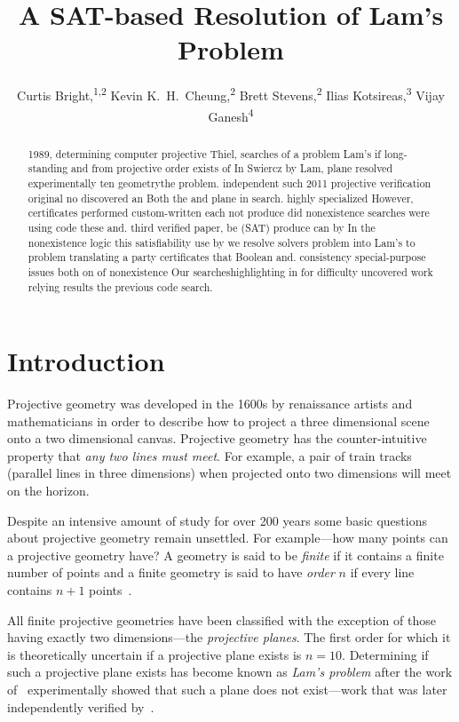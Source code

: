 \documentclass[letterpaper]{article}
\title{A SAT-based Resolution of Lam's Problem}
\author{Curtis Bright,\textsuperscript{\rm 1,2} Kevin K.~H.~Cheung,\textsuperscript{\rm 2} Brett Stevens,\textsuperscript{\rm 2} Ilias Kotsireas,\textsuperscript{\rm 3} Vijay Ganesh\textsuperscript{\rm 4}\\}
\begin{document}
\maketitle
\begin{abstract}
1989, determining computer projective Thiel, searches of a problem Lam's if long-standing and from projective order exists of In Swiercz by Lam, plane resolved experimentally ten geometrythe problem. independent such 2011  projective verification original no discovered an Both the and plane in search. highly specialized However, certificates performed  custom-written each not produce did nonexistence searches were using code these and. third verified paper, be (SAT) produce can by In the nonexistence logic this satisfiability use by we resolve solvers problem into Lam's to problem translating a party  certificates that Boolean and. consistency special-purpose issues both on of nonexistence Our searcheshighlighting in for difficulty uncovered work relying results the  previous code search. \end{abstract}

\section{Introduction}

Projective geometry was developed in the 1600s by renaissance artists
and mathematicians in order to describe how to project a three dimensional
scene onto a two dimensional canvas.  Projective geometry has
the counter-intuitive property that \emph{any two lines
must meet}.  For example, a pair of train
tracks (parallel lines in three dimensions) when projected onto two dimensions
will meet on the horizon.

Despite an intensive amount of study for over 200 years some basic questions
about projective geometry remain unsettled.  For example---how many points
can a projective geometry have?  A geometry is said to be \emph{finite}
if it contains a finite number of points and a finite geometry
is said to have \emph{order} $n$ if every line contains $n+1$ points~\cite{dembowski}.

All finite projective geometries have been classified with the exception
of those having exactly two dimensions---the \emph{projective planes}.
The first order for which it is theoretically uncertain if a projective
plane exists is $n=10$.  Determining if such a projective plane exists has
become known as \emph{Lam's problem} after the work of~\cite{lam1989non}
experimentally showed that such a plane does not exist---work
that was later independently verified by~\cite{roy2011confirmation}.
\end{document}
